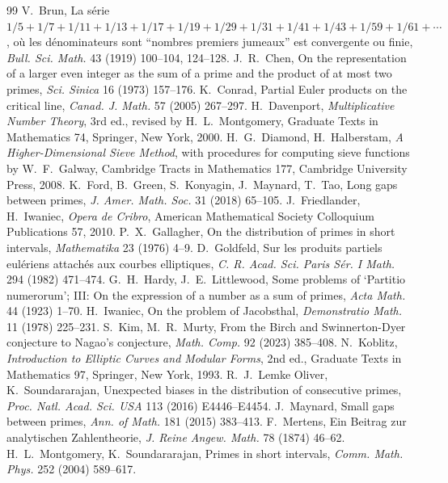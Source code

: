 \documentclass[11pt]{article}
\theoremstyle{definition}\newtheorem{definition}[theorem]{Definition}
\theoremstyle{remark}\newtheorem{remark}[theorem]{Remark}
\begin{document}
\begin{thebibliography}{99}\small
{} V.~Brun, La s\'erie $1/5+1/7+1/11+1/13+1/17+1/19+1/29+1/31+1/41+1/43+1/59+1/61+\cdots$, o\`u les d\'enominateurs sont ``nombres premiers jumeaux'' est convergente ou finie, \emph{Bull. Sci. Math.} 43 (1919) 100--104, 124--128.
 J.~R.~Chen, On the representation of a larger even integer as the sum of a prime and the product of at most two primes, \emph{Sci. Sinica} 16 (1973) 157--176.
 K.~Conrad, Partial Euler products on the critical line, \emph{Canad. J. Math.} 57 (2005) 267--297.
 H.~Davenport, \emph{Multiplicative Number Theory}, 3rd ed., revised by H.~L.~Montgomery, Graduate Texts in Mathematics 74, Springer, New York, 2000.
 H.~G.~Diamond, H.~Halberstam, \emph{A Higher-Dimensional Sieve Method}, with procedures for computing sieve functions by W.~F.~Galway, Cambridge Tracts in Mathematics 177, Cambridge University Press, 2008.
 K.~Ford, B.~Green, S.~Konyagin, J.~Maynard, T.~Tao, Long gaps between primes, \emph{J. Amer. Math. Soc.} 31 (2018) 65--105.
 J.~Friedlander, H.~Iwaniec, \emph{Opera de Cribro}, American Mathematical Society Colloquium Publications 57, 2010.
 P.~X.~Gallagher, On the distribution of primes in short intervals, \emph{Mathematika} 23 (1976) 4--9.
 D.~Goldfeld, Sur les produits partiels eul\'eriens attach\'es aux courbes elliptiques, \emph{C. R. Acad. Sci. Paris S\'er. I Math.} 294 (1982) 471--474.
 G.~H.~Hardy, J.~E.~Littlewood, Some problems of `Partitio numerorum'; III: On the expression of a number as a sum of primes, \emph{Acta Math.} 44 (1923) 1--70.
 H.~Iwaniec, On the problem of Jacobsthal, \emph{Demonstratio Math.} 11 (1978) 225--231.
 S.~Kim, M.~R.~Murty, From the Birch and Swinnerton-Dyer conjecture to Nagao's conjecture, \emph{Math. Comp.} 92 (2023) 385--408.
 N.~Koblitz, \emph{Introduction to Elliptic Curves and Modular Forms}, 2nd ed., Graduate Texts in Mathematics 97, Springer, New York, 1993.
 R.~J.~Lemke Oliver, K.~Soundararajan, Unexpected biases in the distribution of consecutive primes, \emph{Proc. Natl. Acad. Sci. USA} 113 (2016) E4446--E4454.
 J.~Maynard, Small gaps between primes, \emph{Ann. of Math.} 181 (2015) 383--413.
 F.~Mertens, Ein Beitrag zur analytischen Zahlentheorie, \emph{J. Reine Angew. Math.} 78 (1874) 46--62.
 H.~L.~Montgomery, K.~Soundararajan, Primes in short intervals, \emph{Comm. Math. Phys.} 252 (2004) 589--617.

\end{thebibliography}
\end{document}

